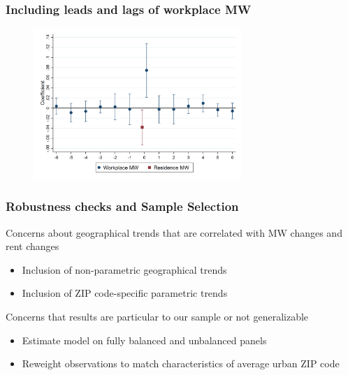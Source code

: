 \documentclass[aspectratio=169, t]{beamer}
\begin{document}
\begin{frame}[label = dyn_baseline_plot]
	\frametitle{Including leads and lags of workplace MW}

	\begin{figure}
		\centering
		\vspace{-2mm}
		\includegraphics[width=0.70\textwidth]{fd_baseline/output/fd_baseline_exp_ln_mw_17_dynamic.png}
	\end{figure}

	\hyperlink{dynamic_mw}{}
	\hyperlink{fd_both_dynamic}{}

	
\end{frame}

\begin{frame}[label = robus_sample]
	\frametitle{Robustness checks and Sample Selection}

	Concerns about geographical trends that are correlated with MW changes and rent changes	
	\begin{itemize}
		\item Inclusion of non-parametric geographical trends
		\item Inclusion of ZIP code-specific parametric trends
	\end{itemize}
	\hyperlink{robustness_geo}{}

	\vspace{3mm}
	Concerns that results are particular to our sample or not generalizable
	\begin{itemize}
		\item Estimate model on fully balanced and unbalanced panels
		\item Reweight observations to match characteristics of average urban ZIP code
	\end{itemize}
	\hyperlink{robustness_geo}{}

\end{frame}
\end{document}
